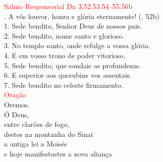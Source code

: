 \documentclass{book}
\begin{document}
\begin{flushleft}
    \textcolor{red}{Salmo Responsorial
        \hspace{\fill} Dn 3,52.53.54--55.56b}
    \vspace{0.1cm} \\
    {\color{red} \Rbar.} A vós louvor, honra e glória eternamente!
    \hspace{\fill}
    {\color{red} (\Rbar. 52b)}
    \vspace{0.1cm} \\
    1. Sede bendito, Senhor Deus de nossos pais.
    \vspace{0.1cm} \\
    2. Sede bendito, nome santo e glorioso.
    \vspace{0.1cm} \\
    3. No templo santo, onde refulge a vossa glória.
    \vspace{0.1cm} \\
    4. E em vosso trono de poder vitorioso.
    \vspace{0.1cm} \\
    5. Sede bendito, que sondais as profundezas.
    \vspace{0.1cm} \\
    6. E superior aos querubins vos assentais.
    \vspace{0.1cm} \\
    7. Sede bendito no celeste firmamento.
    \vspace{0.2cm} \\
    \textcolor{red}{Oração}
    \vspace{0.1cm} \\
    Oremos.
    \vspace{0.1cm}\\
    Ó Deus, \\
    entre clarões de fogo, \\
    destes na montanha do Sinai \\
    a antiga lei a Moisés \\
    e hoje manifestastes a nova aliança \\

\end{flushleft}
\end{document}
